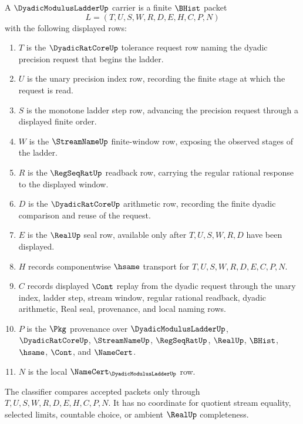 \begin{definition}
\label{def:dyadic-modulus-ladder-carrier}
A $\DyadicModulusLadderUp$ carrier is a finite $\BHist$ packet
$$
L=(T,U,S,W,R,D,E,H,C,P,N)
$$
with the following displayed rows:
\begin{enumerate}
\item $T$ is the $\DyadicRatCoreUp$ tolerance request row naming the dyadic precision request that begins the ladder.
\item $U$ is the unary precision index row, recording the finite stage at which the request is read.
\item $S$ is the monotone ladder step row, advancing the precision request through a displayed finite order.
\item $W$ is the $\StreamNameUp$ finite-window row, exposing the observed stages of the ladder.
\item $R$ is the $\RegSeqRatUp$ readback row, carrying the regular rational response to the displayed window.
\item $D$ is the $\DyadicRatCoreUp$ arithmetic row, recording the finite dyadic comparison and reuse of the request.
\item $E$ is the $\RealUp$ seal row, available only after $T,U,S,W,R,D$ have been displayed.
\item $H$ records componentwise $\hsame$ transport for $T,U,S,W,R,D,E,C,P,N$.
\item $C$ records displayed $\Cont$ replay from the dyadic request through the unary index, ladder step, stream window, regular rational readback, dyadic arithmetic, Real seal, provenance, and local naming rows.
\item $P$ is the $\Pkg$ provenance over $\DyadicModulusLadderUp$, $\DyadicRatCoreUp$, $\StreamNameUp$, $\RegSeqRatUp$, $\RealUp$, $\BHist$, $\hsame$, $\Cont$, and $\NameCert$.
\item $N$ is the local $\NameCert_{\DyadicModulusLadderUp}$ row.
\end{enumerate}
The classifier compares accepted packets only through $T,U,S,W,R,D,E,H,C,P,N$. It has no coordinate for quotient stream equality, selected limits, countable choice, or ambient $\RealUp$ completeness.
\end{definition}

